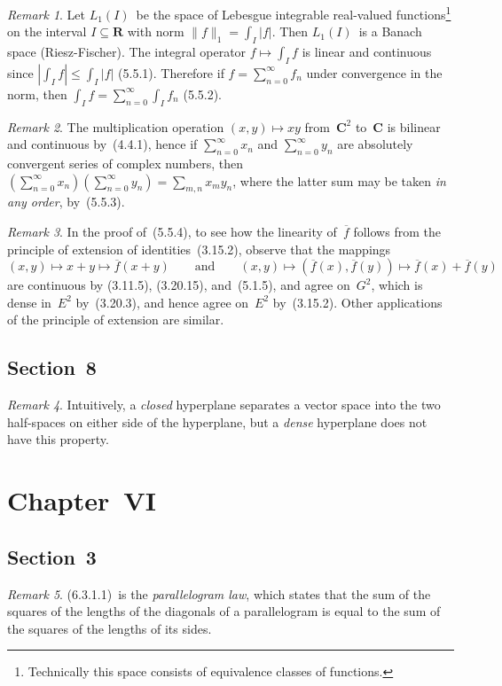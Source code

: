 \documentclass[letterpaper,12pt]{article}
\newcommand{\R}{\mathbf{R}}
\newcommand{\C}{\mathbf{C}}
\newcommand{\closure}[1]{\overline{#1}}
\newcommand{\abs}[1]{|{#1}|}
\newcommand{\norm}[1]{\lVert{#1}\rVert}
\theoremstyle{plain}
\theoremstyle{definition}
\theoremstyle{remark}
\newtheorem*{rmk}{Remark}
\begin{document}
\begin{rmk}
Let \(L_1(I)\)~be the space of Lebesgue integrable real-valued functions\footnote{Technically this space consists of equivalence classes of functions.} on the interval \(I\subseteq\R\) with norm \(\norm{f}_1=\int_I\abs{f}\). Then \(L_1(I)\)~is a Banach space (Riesz-Fischer). The integral operator \(f\mapsto\int_If\) is linear and continuous since \(\abs{\int_If}\le\int_I\abs{f}\) (5.5.1). Therefore if \(f=\sum_{n=0}^{\infty}f_n\) under convergence in the norm, then \(\int_I f=\sum_{n=0}^{\infty}\int_I f_n\) (5.5.2).
\end{rmk}

\begin{rmk}
The multiplication operation \((x,y)\mapsto xy\) from~\(\C^2\) to~\(\C\) is bilinear and continuous by~(4.4.1), hence if \(\sum_{n=0}^{\infty}x_n\) and \(\sum_{n=0}^{\infty}y_n\) are absolutely convergent series of complex numbers, then \((\sum_{n=0}^{\infty}x_n)(\sum_{n=0}^{\infty}y_n)=\sum_{m,n}x_my_n\), where the latter sum may be taken \emph{in any order}, by~(5.5.3).
\end{rmk}

\begin{rmk}
In the proof of~(5.5.4), to see how the linearity of~\(\closure{f}\) follows from the principle of extension of identities~(3.15.2), observe that the mappings
\[(x,y)\mapsto x+y\mapsto\closure{f}(x+y)\qquad\text{and}\qquad(x,y)\mapsto(\closure{f}(x),\closure{f}(y))\mapsto\closure{f}(x)+\closure{f}(y)\]
are continuous by (3.11.5), (3.20.15), and~(5.1.5), and agree on~\(G^2\), which is dense in~\(E^2\) by~(3.20.3), and hence agree on~\(E^2\) by~(3.15.2). Other applications of the principle of extension are similar.
\end{rmk}

\subsection*{Section~8}
\begin{rmk}
Intuitively, a \emph{closed} hyperplane separates a vector space into the two half-spaces on either side of the hyperplane, but a \emph{dense} hyperplane does not have this property.
\end{rmk}

\section*{Chapter~VI}
\subsection*{Section~3}
\begin{rmk}
(6.3.1.1)~is the \emph{parallelogram law}, which states that the sum of the squares of the lengths of the diagonals of a parallelogram is equal to the sum of the squares of the lengths of its sides.
\end{rmk}
\end{document}
